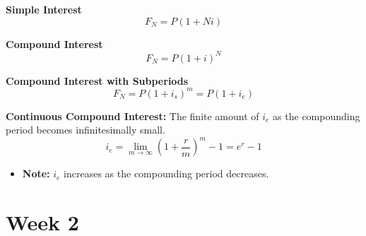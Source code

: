 \documentclass{article}
\begin{document}
    \begin{definition}
        \textbf{Simple Interest} 
        \begin{equation}
            F_N = P(1 + Ni)
        \end{equation}
    \end{definition}

    \begin{definition}
        \textbf{Compound Interest} 
        \begin{equation}
            F_N = P(1 + i)^N
        \end{equation}
    \end{definition}

    \begin{definition}
        \textbf{Compound Interest with Subperiods} 
        \begin{equation}
            F_N = P(1 + i_s)^{m} = P(1 + i_e) %
        \end{equation}
    \end{definition}

    \begin{definition}
        \textbf{Continuous Compound Interest:} The finite amount of \(i_e\) as the compounding period becomes infinitesimally small.
        \begin{equation}
            i_e = \lim_{m \to \infty} \left(1 + \frac{r}{m}\right)^m - 1 = e^r - 1
        \end{equation}
        \begin{itemize}
            \item \textbf{Note:} \(i_e\) increases as the compounding period decreases.
        \end{itemize}
    \end{definition}

\section{Week 2}
\end{document}
